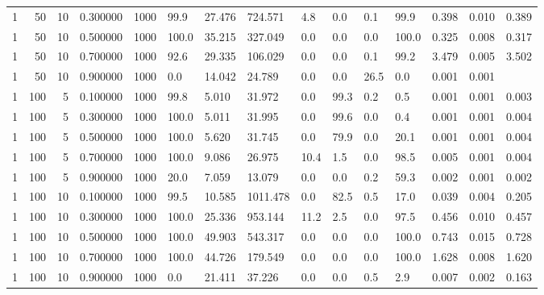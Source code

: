 \begin{tabular}{rrrrrllllllllll}
1 & 50 & 10 & 0.300000 & 1000 & 99.9 & 27.476 & 724.571 & 4.8 & 0.0 & 0.1 & 99.9 & 0.398 & 0.010 & 0.389 \\
1 & 50 & 10 & 0.500000 & 1000 & 100.0 & 35.215 & 327.049 & 0.0 & 0.0 & 0.0 & 100.0 & 0.325 & 0.008 & 0.317 \\
1 & 50 & 10 & 0.700000 & 1000 & 92.6 & 29.335 & 106.029 & 0.0 & 0.0 & 0.1 & 99.2 & 3.479 & 0.005 & 3.502 \\
1 & 50 & 10 & 0.900000 & 1000 & 0.0 & 14.042 & 24.789 & 0.0 & 0.0 & 26.5 & 0.0 & 0.001 & 0.001 &  \\
1 & 100 & 5 & 0.100000 & 1000 & 99.8 & 5.010 & 31.972 & 0.0 & 99.3 & 0.2 & 0.5 & 0.001 & 0.001 & 0.003 \\
1 & 100 & 5 & 0.300000 & 1000 & 100.0 & 5.011 & 31.995 & 0.0 & 99.6 & 0.0 & 0.4 & 0.001 & 0.001 & 0.004 \\
1 & 100 & 5 & 0.500000 & 1000 & 100.0 & 5.620 & 31.745 & 0.0 & 79.9 & 0.0 & 20.1 & 0.001 & 0.001 & 0.004 \\
1 & 100 & 5 & 0.700000 & 1000 & 100.0 & 9.086 & 26.975 & 10.4 & 1.5 & 0.0 & 98.5 & 0.005 & 0.001 & 0.004 \\
1 & 100 & 5 & 0.900000 & 1000 & 20.0 & 7.059 & 13.079 & 0.0 & 0.0 & 0.2 & 59.3 & 0.002 & 0.001 & 0.002 \\
1 & 100 & 10 & 0.100000 & 1000 & 99.5 & 10.585 & 1011.478 & 0.0 & 82.5 & 0.5 & 17.0 & 0.039 & 0.004 & 0.205 \\
1 & 100 & 10 & 0.300000 & 1000 & 100.0 & 25.336 & 953.144 & 11.2 & 2.5 & 0.0 & 97.5 & 0.456 & 0.010 & 0.457 \\
1 & 100 & 10 & 0.500000 & 1000 & 100.0 & 49.903 & 543.317 & 0.0 & 0.0 & 0.0 & 100.0 & 0.743 & 0.015 & 0.728 \\
1 & 100 & 10 & 0.700000 & 1000 & 100.0 & 44.726 & 179.549 & 0.0 & 0.0 & 0.0 & 100.0 & 1.628 & 0.008 & 1.620 \\
1 & 100 & 10 & 0.900000 & 1000 & 0.0 & 21.411 & 37.226 & 0.0 & 0.0 & 0.5 & 2.9 & 0.007 & 0.002 & 0.163 \\
\bottomrule
\end{tabular}
